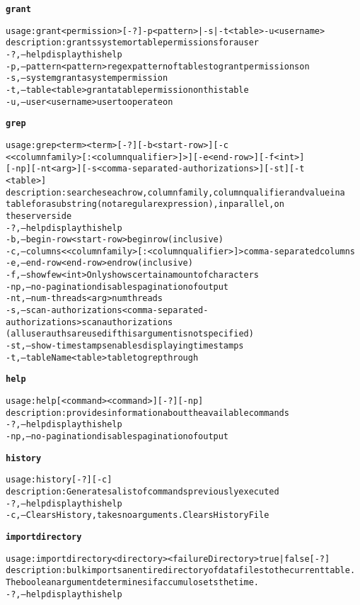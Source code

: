 \begin{alltt}
\textbf{grant}

    usage: grant <permission> [-?] -p <pattern> | -s | -t <table>  -u <username>
    description: grants system or table permissions for a user
      -?,--help  display this help
      -p,--pattern <pattern>  regex pattern of tables to grant permissions on
      -s,--system  grant a system permission
      -t,--table <table>  grant a table permission on this table
      -u,--user <username>	user to operate on

\textbf{grep}

    usage: grep <term>{ <term>} [-?] [-b <start-row>] [-c
    	      <{<columnfamily>[:<columnqualifier>]}>] [-e <end-row>] [-f <int>]
    	      [-np] [-nt <arg>] [-s <comma-separated-authorizations>] [-st] [-t
    	      <table>]
    description: searches each row, column family, column qualifier and value in a
    	      table for a substring (not a regular expression), in parallel, on
    	      the server side
      -?,--help  display this help
      -b,--begin-row <start-row>  begin row (inclusive)
      -c,--columns <{<columnfamily>[:<columnqualifier>]}>  comma-separated columns
      -e,--end-row <end-row>  end row (inclusive)
      -f,--show few <int>  Only shows certain amount of characters
      -np,--no-pagination  disables pagination of output
      -nt,--num-threads <arg>  num threads
      -s,--scan-authorizations <comma-separated-authorizations>  scan authorizations
    	      (all user auths are used if this argument is not specified)
      -st,--show-timestamps  enables displaying timestamps
      -t,--tableName <table>  table to grep through

\textbf{help}

    usage: help [ <command>{ <command>} ] [-?] [-np]
    description: provides information about the available commands
      -?,--help  display this help
      -np,--no-pagination  disables pagination of output

\textbf{history}

    usage: history [-?] [-c]
    description: Generates a list of commands previously executed
      -?,--help  display this help
      -c,--Clears History, takes no arguments.  Clears History File

\textbf{importdirectory}

    usage: importdirectory <directory> <failureDirectory> true|false [-?]
    description: bulk imports an entire directory of data files to the current table.
    	       The boolean argument determines if accumulo sets the time.
      -?,--help  display this help


\end{alltt}
